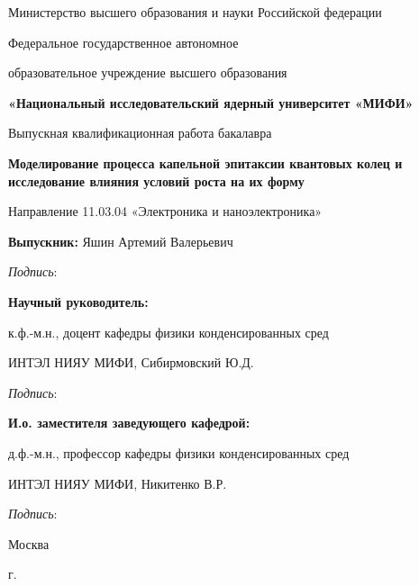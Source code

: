 \begin{titlepage}
\begin{center}
{Министерство высшего образования и науки Российской федерации}

{Федеральное государственное автономное}

{образовательное учреждение высшего образования}

{\textbf{«Национальный исследовательский ядерный университет «МИФИ»}}

\vspace{20mm}

Выпускная квалификационная работа бакалавра

\textbf{\large Моделирование процесса капельной эпитаксии квантовых колец и исследование влияния условий роста на их форму}

\vspace{10mm}
Направление 11.03.04 «Электроника и наноэлектроника»\\

\vspace{10mm}

\begin{flushleft}
\textbf{Выпускник:} Яшин Артемий Валерьевич

\hspace{10cm} \textit{Подпись}: \space \hrulefill

\textbf{Научный руководитель:} 

к.ф.-м.н., доцент кафедры физики конденсированных сред

ИНТЭЛ НИЯУ МИФИ, Сибирмовский Ю.Д.

\hspace{10cm} \textit{Подпись}: \space \hrulefill

\textbf{И.о. заместителя заведующего кафедрой:} 

д.ф.-м.н., профессор кафедры физики конденсированных сред 

ИНТЭЛ НИЯУ МИФИ, Никитенко В.Р.

\hspace{10cm} \textit{Подпись}: \space \hrulefill \space
\end{flushleft}

\vfill

{Москва}
\par{\the\year{} г.}
\end{center}
\end{titlepage}